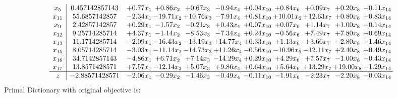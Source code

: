 \documentclass[9pt]{article}
\begin{document}
\[\begin{array}{c| c c@{\hskip 2pt} c@{\hskip 2pt} c@{\hskip 2pt} c@{\hskip 2pt} c@{\hskip 2pt} c@{\hskip 2pt} c@{\hskip 2pt} c@{\hskip 2pt} c@{\hskip 2pt} }
 x_{5}   &  0.457142857143 & +  0.77 x_{1} & +  0.86 x_{2} & +  0.67 x_{3} & -0.94 x_{4} & +  0.04 x_{10} & +  0.84 x_{6} & +  0.09 x_{7} & +  0.20 x_{8} & -0.11 x_{14}\\
 x_{11}   &  55.6857142857 & -2.34 x_{1} & -19.71 x_{2} & + 10.76 x_{3} & -7.91 x_{4} & +  0.81 x_{10} & + 10.01 x_{6} & + 12.63 x_{7} & +  0.80 x_{8} & +  0.83 x_{14}\\
 x_{9}   &  2.42857142857 & +  0.29 x_{1} & -1.57 x_{2} & -0.21 x_{3} & +  0.43 x_{4} & +  0.07 x_{10} & +  0.07 x_{6} & +  1.14 x_{7} & +  1.00 x_{8} & +  0.14 x_{14}\\
 x_{12}   &  9.25714285714 & +  4.37 x_{1} & -1.14 x_{2} & -8.53 x_{3} & -7.34 x_{4} & +  0.24 x_{10} & -0.56 x_{6} & +  7.49 x_{7} & +  7.80 x_{8} & +  0.69 x_{14}\\
 x_{13}   &  11.1714285714 & -2.09 x_{1} & -16.43 x_{2} & -13.19 x_{3} & + 14.77 x_{4} & +  0.33 x_{10} & +  1.13 x_{6} & +  3.66 x_{7} & -2.80 x_{8} & +  1.46 x_{14}\\
 x_{15}   &  8.05714285714 & -3.03 x_{1} & -11.14 x_{2} & -14.73 x_{3} & + 11.26 x_{4} & -0.56 x_{10} & -10.96 x_{6} & -12.11 x_{7} & +  2.40 x_{8} & +  0.49 x_{14}\\
 x_{16}   &  34.7142857143 & -4.86 x_{1} & +  6.71 x_{2} & +  7.14 x_{3} & -14.29 x_{4} & +  0.29 x_{10} & +  4.29 x_{6} & +  7.57 x_{7} & -1.00 x_{8} & -0.43 x_{14}\\
 x_{17}   &  13.8571428571 & +  7.57 x_{1} & -12.14 x_{2} & +  5.07 x_{3} & +  9.86 x_{4} & +  0.64 x_{10} & +  5.64 x_{6} & + 13.29 x_{7} & + 19.00 x_{8} & +  1.29 x_{14}\\
\hline
z    &  -2.88571428571 & -2.06 x_{1} & -0.29 x_{2} & -1.46 x_{3} & -0.49 x_{4} & -0.11 x_{10} & -1.91 x_{6} & -2.23 x_{7} & -2.20 x_{8} & -0.03 x_{14}\\
\end{array}\]
Primal Dictionary with original objective is:
\end{document}
